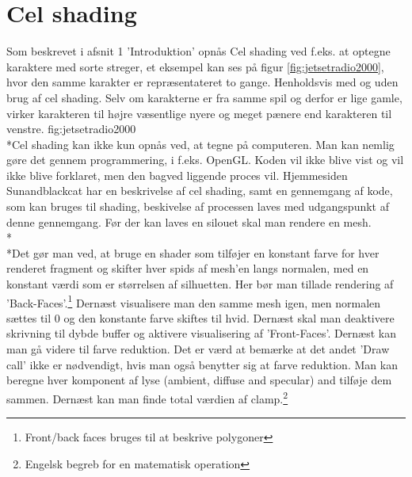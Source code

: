 \section{Cel shading}
Som beskrevet i afsnit 1 'Introduktion' opnås Cel shading ved f.eks. at optegne karaktere med sorte streger, et eksempel kan ses på figur \ref{fig:jetsetradio2000}, hvor den samme karakter er repræsentateret to gange. Henholdsvis med og uden brug af cel shading. Selv om karakterne er fra samme spil og derfor er lige gamle, virker karakteren til højre væsentlige nyere og meget pænere end karakteren til venstre. {fig:jetsetradio2000}\\*Cel shading kan ikke kun opnås ved, at tegne på computeren. Man kan nemlig gøre det gennem
programmering, i f.eks. OpenGL. Koden vil ikke blive vist og vil ikke blive forklaret, men den
bagved liggende proces vil. Hjemmesiden Sunandblackcat \cite{sunandblackcat2016} har en
beskrivelse af cel shading, samt en gennemgang af kode, som kan bruges til shading, beskivelse
af processen laves med udgangspunkt af denne gennemgang. Før der kan laves en silouet skal man
rendere en mesh.\\*\\*Det gør man ved, at bruge en shader som tilføjer en konstant farve for
hver renderet fragment og skifter hver spids af mesh’en langs normalen, med en konstant værdi
som er størrelsen af silhuetten. Her bør man tillade rendering af ’Back-Faces’.\footnote[1]
{Front/back faces bruges til at beskrive polygoner}
Dernæst visualisere man den samme mesh igen, men normalen sættes til 0 og den konstante farve
skiftes til hvid.\newpage 
Dernæst skal man deaktivere skrivning til dybde buffer og aktivere
visualisering af ’Front-Faces’. Dernæst kan man gå videre til farve reduktion. Det er værd at
bemærke at det andet ’Draw call’ ikke er nødvendigt, hvis man også benytter sig at farve
reduktion. 
Man kan beregne hver komponent af lyse (ambient, diffuse and specular) and tilføje dem sammen.
Dernæst kan man finde total værdien af clamp.\footnote[2]{Engelsk begreb for en matematisk
operation}

